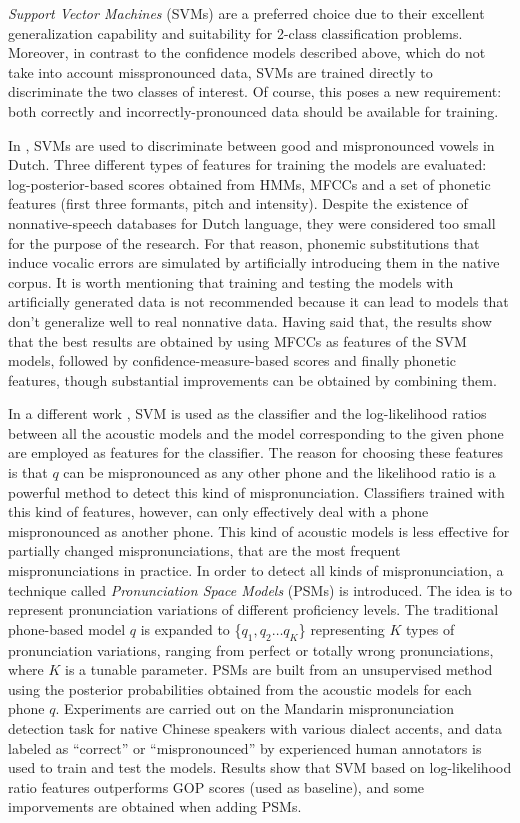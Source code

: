 \textit{Support Vector Machines} (SVMs) are a preferred choice 
due to their excellent generalization capability and suitability for 2-class classification
problems. Moreover, in contrast to the confidence models described above, which do not take into
account misspronounced data, SVMs are trained directly to discriminate the two classes of interest.
Of course, this poses a new requirement: both correctly and incorrectly-pronounced data should be
available for training.

In \cite{detection_mispronunciation_dutch_vowel}, SVMs are used to discriminate
between good and mispronounced vowels in Dutch.
Three different types of features for training the models are evaluated: log-posterior-based 
scores obtained from HMMs, MFCCs and a set of 
phonetic features (first three formants, pitch and intensity). Despite the existence of nonnative-speech  
databases for Dutch language, they were considered too small for the purpose of the research. 
For that reason, phonemic 
substitutions that induce vocalic errors are simulated by artificially introducing them in the native corpus. It is worth mentioning that training
and testing the models with artificially generated data is not recommended
because it can lead to models that don't generalize well to real nonnative data.
Having said that, the results show that the best 
results are obtained by using MFCCs as features of the SVM models, followed by confidence-measure-based 
scores and finally phonetic
features, though substantial improvements can be obtained by combining them.

In a different work \cite{svm_space_models}, SVM is used as the classifier and the
log-likelihood ratios between all the acoustic models and the model corresponding to the given
phone are employed as features for the classifier. The reason for choosing these features is
that $q$ can be mispronounced as any other phone and the likelihood ratio is a powerful
method to detect this kind of mispronunciation. Classifiers trained with this kind of features, however, 
can only effectively deal with a phone mispronounced as another phone. This kind of acoustic models is 
less effective for partially changed mispronunciations, that are the most frequent mispronunciations
in practice. In order to detect all kinds of mispronunciation, a technique called  
\textit{Pronunciation Space Models} (PSMs) is introduced. The idea is to represent pronunciation variations
of different proficiency levels. The traditional phone-based model $q$ is expanded to 
\{$q_{1}, q_{2} \dotsc q_{K}$\} representing $K$ types of pronunciation variations, ranging from perfect or
totally wrong pronunciations, where $K$ is a tunable parameter. PSMs are built from an unsupervised method
using the posterior probabilities obtained from the acoustic models for each phone $q$.
Experiments are carried out on the 
Mandarin mispronunciation detection task for native Chinese speakers with various dialect accents, 
and data labeled as ``correct'' or ``mispronounced'' by experienced human annotators is used to train and test the models.
Results show that SVM based on log-likelihood ratio features outperforms GOP scores (used as baseline), and some
imporvements are obtained when adding PSMs.

